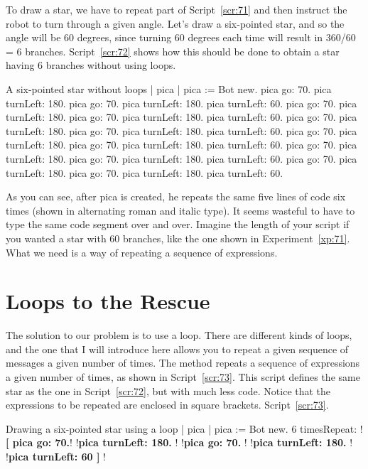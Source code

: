 \documentclass[a4paper,10pt,twoside]{book}
\begin{document}
To draw a star, we have to repeat part of Script~\ref{scr:71} and then instruct the robot to turn 
through a given angle. Let’s draw a six-pointed star, and so the angle will be 60 degrees, since 
turning 60 degrees each time will result in 360/60 = 6 branches. Script~\ref{scr:72} shows how this 
should be done to obtain a star having 6 branches without using loops. 


\begin{script}[72]{A six-pointed star without loops}
| pica | 
pica := Bot new. 
pica go: 70. 
pica turnLeft: 180. 
pica go: 70. 
pica turnLeft: 180. 
pica turnLeft: 60. 
pica go: 70. 
pica turnLeft: 180. 
pica go: 70. 
pica turnLeft: 180. 
pica turnLeft: 60. 
pica go: 70. 
pica turnLeft: 180. 
pica go: 70. 
pica turnLeft: 180. 
pica turnLeft: 60. 
pica go: 70. 
pica turnLeft: 180. 
pica go: 70. 
pica turnLeft: 180. 
pica turnLeft: 60. 
pica go: 70. 
pica turnLeft: 180. 
pica go: 70. 
pica turnLeft: 180. 
pica turnLeft: 60. 
pica go: 70. 
pica turnLeft: 180. 
pica go: 70. 
pica turnLeft: 180. 
pica turnLeft: 60.
\end{script}

As you can see, after pica is created, he repeats the same five lines of code six times (shown 
in alternating roman and italic type). It seems wasteful to have to type the same code segment 
over and over. Imagine the length of your script if you wanted a star with 60 branches, like the 
one shown in Experiment~\ref{xp:71}. What we need is a way of repeating a sequence of expressions.

\section{Loops to the Rescue} 

The solution to our problem is to use a loop. There are different kinds of loops, and the one 
that I will introduce here allows you to repeat a given sequence of messages a given number of 
times. The method  repeats a sequence of expressions a given number of times, 
as shown in Script~\ref{scr:73}. This script defines the same star as the one in Script~\ref{scr:72}, but with 
much less code. Notice that the expressions to be repeated are enclosed in square brackets. 
Script~\ref{scr:73}.

\begin{script}[73]{Drawing a six-pointed star using a loop}
| pica | 
pica := Bot new. 
6 timesRepeat: 
	!\textbf{[ pica go: 70.}!
	!\textbf{pica turnLeft: 180. }!
	!\textbf{pica go: 70. }!
	!\textbf{pica turnLeft: 180. }!
	!\textbf{pica turnLeft: 60 ] }!
\end{script}
\end{document}
